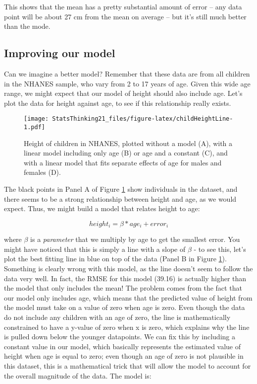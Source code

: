 \documentclass[]{book}
\theoremstyle{definition}
\theoremstyle{definition}
\theoremstyle{definition}
\theoremstyle{remark}
\begin{document}
This shows that the mean has a pretty substantial amount of error -- any
data point will be about 27 cm from the mean on average -- but it's
still much better than the mode.

\subsection{Improving our model}\label{improving-our-model}

Can we imagine a better model? Remember that these data are from all
children in the NHANES sample, who vary from 2 to 17 years of age. Given
this wide age range, we might expect that our model of height should
also include age. Let's plot the data for height against age, to see if
this relationship really exists.

\begin{figure}
\centering
\texttt{[image: StatsThinking21\_files/figure-latex/childHeightLine-1.pdf]}
\caption{\label{fig:childHeightLine}Height of children in NHANES, plotted
without a model (A), with a linear model including only age (B) or age
and a constant (C), and with a linear model that fits separate effects
of age for males and females (D).}
\end{figure}

The black points in Panel A of Figure \ref{fig:childHeightLine} show
individuals in the dataset, and there seems to be a strong relationship
between height and age, as we would expect. Thus, we might build a model
that relates height to age:

\[
height_i =  \beta * age_i + error_i
\]

where \(\beta\) is a \emph{parameter} that we multiply by age to get the
smallest error. You might have noticed that this is simply a line with a
slope of \(\beta\) - to see this, let's plot the best fitting line in
blue on top of the data (Panel B in Figure \ref{fig:childHeightLine}).
Something is clearly wrong with this model, as the line doesn't seem to
follow the data very well. In fact, the RMSE for this model (39.16) is
actually higher than the model that only includes the mean! The problem
comes from the fact that our model only includes age, which means that
the predicted value of height from the model must take on a value of
zero when age is zero. Even though the data do not include any children
with an age of zero, the line is mathematically constrained to have a
y-value of zero when x is zero, which explains why the line is pulled
down below the younger datapoints. We can fix this by including a
constant value in our model, which basically represents the estimated
value of height when age is equal to zero; even though an age of zero is
not plausible in this dataset, this is a mathematical trick that will
allow the model to account for the overall magnitude of the data. The
model is:
\end{document}
